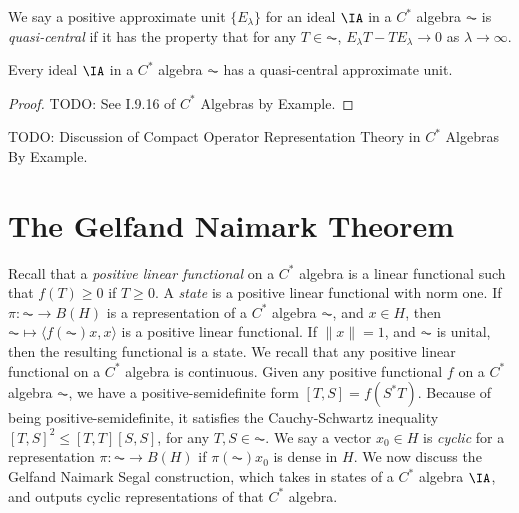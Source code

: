 We say a positive approximate unit $\{ E_\lambda \}$ for an ideal $\IA$ in a $C^*$ algebra $\AC$ is \emph{quasi-central} if it has the property that for any $T \in \AC$, $E_\lambda T - T E_\lambda \to 0$ as $\lambda \to \infty$.

\begin{theorem}
    Every ideal $\IA$ in a $C^*$ algebra $\AC$ has a quasi-central approximate unit.
\end{theorem}
\begin{proof}
    TODO: See I.9.16 of $C^*$ Algebras by Example.
\end{proof}

TODO: Discussion of Compact Operator Representation Theory in $C^*$ Algebras By Example.












\section{The Gelfand Naimark Theorem}

Recall that a \emph{positive linear functional} on a $C^*$ algebra is a linear functional such that $f(T) \geq 0$ if $T \geq 0$. A \emph{state} is a positive linear functional with norm one. If $\pi: \AC \to B(H)$ is a representation of a $C^*$ algebra $\AC$, and $x \in H$, then $\AC \mapsto \langle f(\AC) x, x \rangle$ is a positive linear functional. If $\| x \| = 1$, and $\AC$ is unital, then the resulting functional is a state. We recall that any positive linear functional on a $C^*$ algebra is continuous. Given any positive functional $f$ on a $C^*$ algebra $\AC$, we have a positive-semidefinite form $[T,S] = f(S^*T)$. Because of being positive-semidefinite, it satisfies the Cauchy-Schwartz inequality $[T,S]^2 \leq [T,T] [S,S]$, for any $T,S \in \AC$. We say a vector $x_0 \in H$ is \emph{cyclic} for a representation $\pi: \AC \to B(H)$ if $\pi(\AC) x_0$ is dense in $H$. We now discuss the Gelfand Naimark Segal construction, which takes in states of a $C^*$ algebra $\IA$, and outputs cyclic representations of that $C^*$ algebra.

